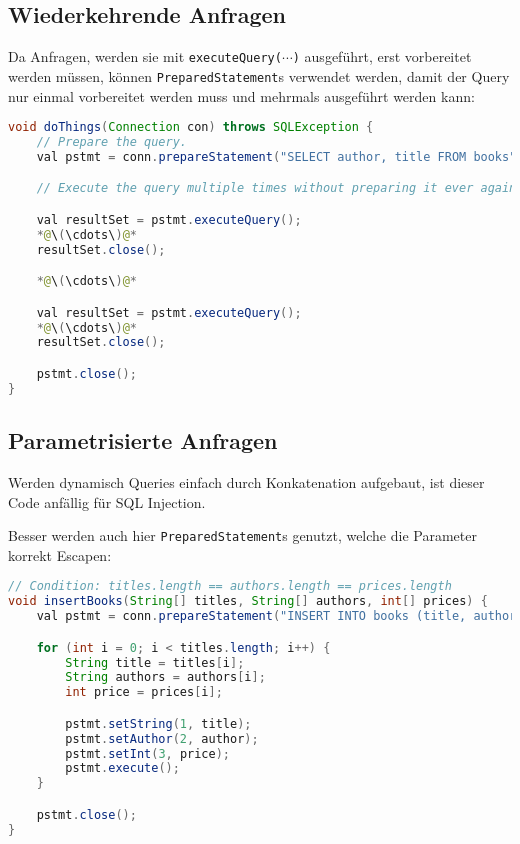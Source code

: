 \documentclass[a4paper, 11pt, accentcolor = tud3b]{tudreport}
\begin{document}
            \subsection{Wiederkehrende Anfragen} %
            	Da Anfragen, werden sie mit \texttt{executeQuery(\(\cdots\))} ausgeführt, erst vorbereitet werden müssen, können \texttt{PreparedStatement}s verwendet werden, damit der Query nur einmal vorbereitet werden muss und mehrmals ausgeführt werden kann:
            	\begin{lstlisting}[language = Java]
void doThings(Connection con) throws SQLException {
	// Prepare the query.
	val pstmt = conn.prepareStatement("SELECT author, title FROM books");

	// Execute the query multiple times without preparing it ever again.

	val resultSet = pstmt.executeQuery();
	*@\(\cdots\)@*
	resultSet.close();

	*@\(\cdots\)@*

	val resultSet = pstmt.executeQuery();
	*@\(\cdots\)@*
	resultSet.close();

	pstmt.close();
}
            	\end{lstlisting}

            \subsection{Parametrisierte Anfragen} %
				Werden dynamisch Queries einfach durch Konkatenation aufgebaut, ist dieser Code anfällig für SQL Injection.
				
				Besser werden auch hier \texttt{PreparedStatement}s genutzt, welche die Parameter korrekt Escapen:
				\begin{lstlisting}[language = Java]
// Condition: titles.length == authors.length == prices.length
void insertBooks(String[] titles, String[] authors, int[] prices) {
	val pstmt = conn.prepareStatement("INSERT INTO books (title, author, price), (?, ?, ?)");

	for (int i = 0; i < titles.length; i++) {
		String title = titles[i];
		String authors = authors[i];
		int price = prices[i];

		pstmt.setString(1, title);
		pstmt.setAuthor(2, author);
		pstmt.setInt(3, price);
		pstmt.execute();
	}

	pstmt.close();
}
				\end{lstlisting}
\end{document}
